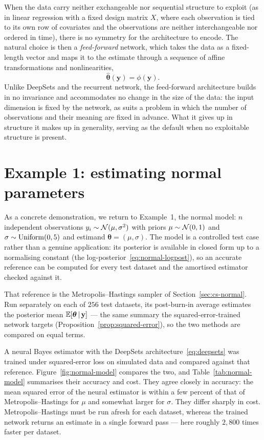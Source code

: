 When the data carry neither exchangeable nor sequential structure to
exploit (as in linear regression with a fixed design matrix
$X$, where each observation is tied to its own row of
covariates and the observations are neither interchangeable nor
ordered in time), there is no symmetry for the architecture to encode.
The natural choice is then a \emph{feed-forward} network, which takes
the data as a fixed-length vector and maps it to the estimate through
a sequence of affine transformations and nonlinearities,
%
\begin{equation}
  \hat{\bm{\theta}}(\mathbf{y}) = \phi(\mathbf{y}).
\end{equation}
%
Unlike DeepSets and the recurrent network, the feed-forward
architecture builds in no invariance and accommodates no change in the
size of the data: the input dimension is fixed by the network, as
suits a problem in which the number of observations and their meaning
are fixed in advance. What it gives up in structure it makes up in
generality, serving as the default when no exploitable structure is
present.






\section{Example 1: estimating normal parameters}
\label{sec:normal-example}

As a concrete demonstration, we return to Example~1, the normal model:
$n$ independent observations
$y_i \sim \mathcal{N}(\mu, \sigma^2)$ with priors $\mu \sim \mathcal{N}(0, 1)$
and $\sigma \sim \mathrm{Uniform}(0, 5)$ and estimand
$\bm{\theta} = (\mu, \sigma)$. The model is a controlled test case
rather than a genuine application: its posterior is available in closed
form up to a normalising constant
(the log-posterior~\eqref{eq:normal-logpost}), so an accurate reference
can be computed for every test dataset and the amortised estimator
checked against it.

That reference is the Metropolis--Hastings sampler of
Section~\ref{sec:cs-normal}. Run separately on each of $256$ test
datasets, its post-burn-in average estimates the posterior mean
$\mathbb{E}[\bm{\theta} \,|\, \mathbf{y}]$ --- the same summary the
squared-error-trained network targets
(Proposition~\ref{prop:squared-error}), so the two methods are compared
on equal terms.

A neural Bayes estimator with the DeepSets
architecture~\eqref{eq:deepsets} was trained under squared-error loss
on simulated data and compared against that reference.
Figure~\ref{fig:normal-model} compares the two, and
Table~\ref{tab:normal-model} summarises their accuracy and cost. They
agree closely in accuracy: the mean squared error of the neural
estimator is within a few percent of that of Metropolis--Hastings for
$\mu$ and somewhat larger for $\sigma$. They differ sharply in cost.
Metropolis--Hastings must be run afresh for each dataset, whereas the
trained network returns an estimate in a single forward pass --- here
roughly $2{,}800$ times faster per dataset.


